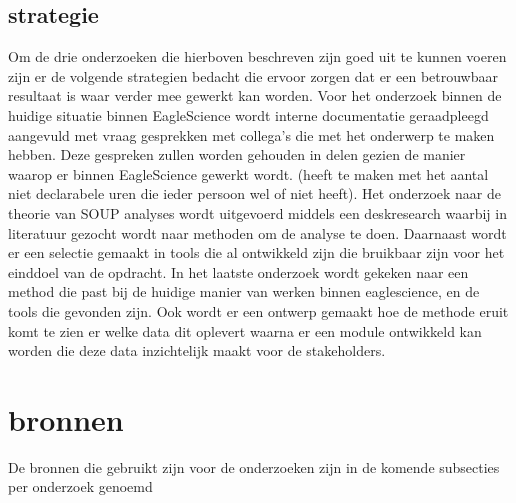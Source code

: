 \subsection{strategie}\label{subsec:opstrategie}
Om de drie onderzoeken die hierboven beschreven zijn goed uit te kunnen voeren zijn er de volgende strategien bedacht die ervoor zorgen dat er een betrouwbaar resultaat is waar verder mee gewerkt kan worden.
Voor het onderzoek binnen de huidige situatie binnen EagleScience wordt interne documentatie geraadpleegd aangevuld met vraag gesprekken met collega's die met het onderwerp te maken hebben. Deze gespreken zullen worden gehouden in delen gezien de manier waarop er binnen EagleScience gewerkt wordt. (heeft te maken met het aantal niet declarabele uren die ieder persoon wel of niet heeft). Het onderzoek naar de theorie van SOUP analyses wordt uitgevoerd middels een deskresearch waarbij in literatuur gezocht wordt naar methoden om de analyse te doen. Daarnaast wordt er een selectie gemaakt in tools die al ontwikkeld zijn die bruikbaar zijn voor het einddoel van de opdracht. In het laatste onderzoek wordt gekeken naar een method die past bij de huidige manier van werken binnen eaglescience, en de tools die gevonden zijn. Ook wordt er een ontwerp gemaakt hoe de methode eruit komt te zien er welke data dit oplevert waarna er een module ontwikkeld kan worden die deze data inzichtelijk maakt voor de stakeholders.


\section{bronnen}\label{subsec:bronnen}
De bronnen die gebruikt zijn voor de onderzoeken zijn in de komende subsecties per onderzoek genoemd

